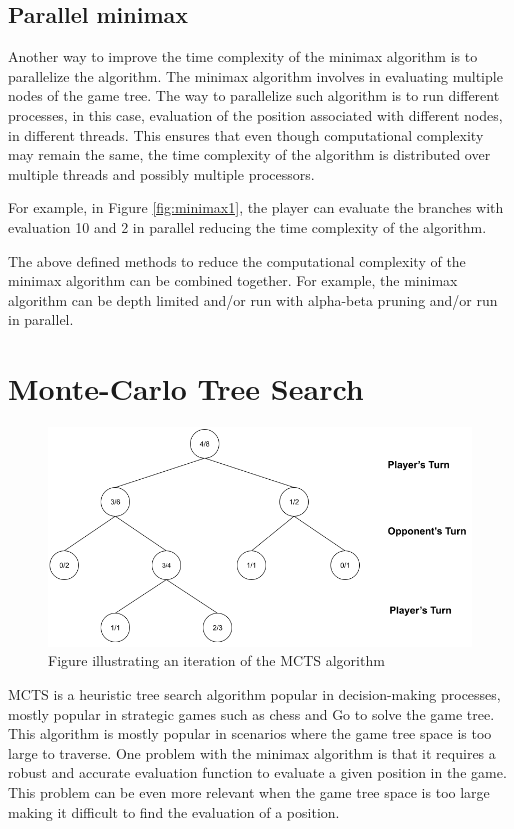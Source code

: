 \subsection{Parallel minimax}
Another way to improve the time complexity of the minimax algorithm is to parallelize the algorithm. The minimax algorithm involves in evaluating multiple nodes of the game tree. The way to parallelize such algorithm is to run different processes, in this case, evaluation of the position associated with different nodes, in different threads. This ensures that even though computational complexity may remain the same, the time complexity of the algorithm is distributed over multiple threads and possibly multiple processors.

For example, in Figure \ref{fig:minimax1}, the player can evaluate the branches with evaluation 10 and 2 in parallel reducing the time complexity of the algorithm.


The above defined methods to reduce the computational complexity of the minimax algorithm can be combined together. For example, the minimax algorithm can be depth limited and/or run with alpha-beta pruning and/or run in parallel.

\section{Monte-Carlo Tree Search}

\begin{figure}[!ht]
    \centering
    \includegraphics[width = \linewidth]{../img/MCTS1.png}
    \caption{Figure illustrating an iteration of the MCTS algorithm}
    \label{fig:MCTS1}
\end{figure}

\ac{MCTS} \cite{Coulom2006Efficient} is a heuristic tree search algorithm popular in decision-making processes, mostly popular in strategic games such as chess and Go to solve the game tree. This algorithm is mostly popular in scenarios where the game tree space is too large to traverse. One problem with the minimax algorithm is that it requires a robust and accurate evaluation function to evaluate a given position in the game. This problem can be even more relevant when the game tree space is too large making it difficult to find the evaluation of a position.

